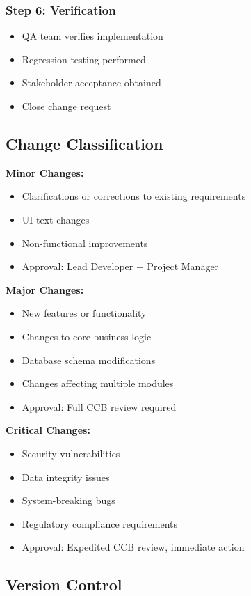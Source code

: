 \documentclass[12pt,a4paper]{article}
\begin{document}
\subsubsection{Step 6: Verification}
\begin{itemize}
    \item QA team verifies implementation
    \item Regression testing performed
    \item Stakeholder acceptance obtained
    \item Close change request
\end{itemize}

\subsection{Change Classification}

\textbf{Minor Changes:}
\begin{itemize}
    \item Clarifications or corrections to existing requirements
    \item UI text changes
    \item Non-functional improvements
    \item Approval: Lead Developer + Project Manager
\end{itemize}

\textbf{Major Changes:}
\begin{itemize}
    \item New features or functionality
    \item Changes to core business logic
    \item Database schema modifications
    \item Changes affecting multiple modules
    \item Approval: Full CCB review required
\end{itemize}

\textbf{Critical Changes:}
\begin{itemize}
    \item Security vulnerabilities
    \item Data integrity issues
    \item System-breaking bugs
    \item Regulatory compliance requirements
    \item Approval: Expedited CCB review, immediate action
\end{itemize}

\subsection{Version Control}
\end{document}
